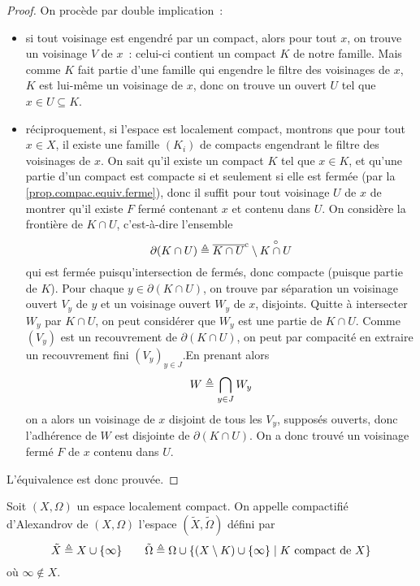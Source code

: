 \begin{proof}
  On procède par double implication~:
  \begin{itemize}
  \item si tout voisinage est engendré par un compact, alors pour tout $x$, on
    trouve un voisinage $V$ de $x$~: celui-ci contient un compact $K$ de notre
    famille. Mais comme $K$ fait partie d'une famille qui engendre le
    filtre des voisinages de $x$, $K$ est lui-même un voisinage de $x$, donc
    on trouve un ouvert $U$ tel que $x \in U \subseteq K$.
  \item réciproquement, si l'espace est localement compact, montrons que pour
    tout $x \in X$, il existe une famille $(K_i)$ de compacts engendrant
    le filtre des voisinages de $x$. On sait qu'il existe un compact $K$ tel que
    $x \in K$, et qu'une partie d'un compact est compacte si et seulement si
    elle est fermée (par la \cref{prop.compac.equiv.ferme}), donc il suffit pour
    tout voisinage $U$ de $x$ de montrer qu'il existe $F$ fermé contenant $x$
    et contenu dans $U$. On considère la frontière de $K \cap U$, c'est-à-dire
    l'ensemble
    \[\partial(K \cap U) \triangleq \overline{K \cap U}^{\mathrm c} \setminus \overset{\circ}{K \cap U}\]
    qui est fermée puisqu'intersection de fermés, donc compacte (puisque partie
    de $K$). Pour chaque $y \in \partial(K \cap U)$, on trouve par séparation
    un voisinage ouvert $V_y$ de $y$ et un voisinage ouvert $W_y$ de $x$,
    disjoints. Quitte à intersecter $W_y$ par $K\cap U$, on peut considérer que
    $W_y$ est une partie de $K \cap U$. Comme $(V_y)$ est un recouvrement de
    $\partial(K\cap U)$, on peut par compacité en extraire un recouvrement
    fini $(V_y)_{y \in J}$.En prenant alors
    \[W \triangleq \bigcap_{y \in J} W_y\]
    on a alors un voisinage de $x$ disjoint de tous les $V_y$, supposés
    ouverts, donc l'adhérence de $W$ est disjointe de $\partial(K \cap U)$.
    On a donc trouvé un voisinage fermé $F$ de $x$ contenu dans $U$.
  \end{itemize}
  L'équivalence est donc prouvée.
\end{proof}

\begin{definition}
  Soit $(X,\Omega)$ un espace localement compact. On appelle compactifié
  d'Alexandrov de $(X,\Omega)$ l'espace $(\tilde X,\tilde\Omega)$ défini par
  \[\tilde X \triangleq X\cup \{\infty\}\qquad
  \tilde\Omega\triangleq \Omega \cup
  \{(X\setminus K) \cup \{\infty\}\mid K \text{ compact de } X\}\]
  où $\infty\notin X$.
\end{definition}

